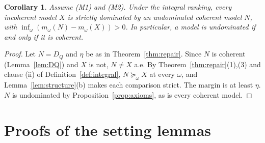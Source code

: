 \documentclass[11pt]{article}
\theoremstyle{plain}
\newtheorem{corollary}[theorem]{Corollary}
\theoremstyle{definition}
\begin{document}
\begin{corollary}\label{cor:repair}
Assume (M1) and (M2). Under the integral ranking, every incoherent model $X$ is strictly
dominated by an undominated coherent model $N$, with $\inf_\omega(m_\omega(N)-m_\omega(X))>0$.
In particular, a model is undominated if and only if it is coherent.
\end{corollary}

\begin{proof}
Let $N=D_Q$ and $\eta$ be as in Theorem~\ref{thm:repair}. Since $N$ is coherent
(Lemma~\ref{lem:DQ}) and $X$ is not,
$N\ne X$ a.e. By Theorem~\ref{thm:repair}(1),(3) and clause (ii) of
Definition~\ref{def:integral}, $N\succeq_\omega X$ at every $\omega$, and
Lemma~\ref{lem:structure}(b) makes each comparison strict. The margin is at least $\eta$. $N$
is undominated by Proposition~\ref{prop:axioms}, as is every coherent model.
\end{proof}

\appendix

\section{Proofs of the setting lemmas}\label{app:setting}
\end{document}
